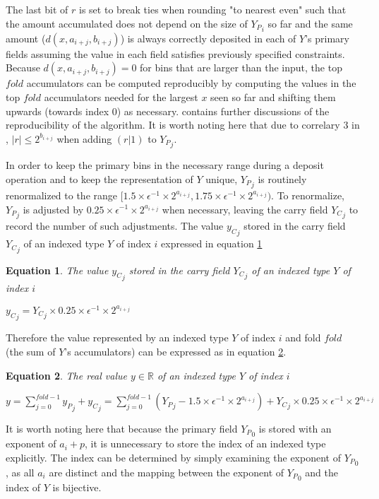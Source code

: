 \documentclass[12pt]{article}
\providecommand{\R}{\ensuremath{\mathbb{R}}}
\theoremstyle{plain}
\newtheorem{eq}{Equation}[section]
\begin{document}
      The last bit of $r$ is set to break ties when rounding "to nearest even" such that the amount accumulated does not depend on the size of ${Y_P}_i$ so far and the same amount ($d(x, a_{i + j}, b_{i + j})$) is always correctly deposited in each of $Y$'s primary fields assuming the value in each field satisfies previously specified constraints. Because $d(x, a_{i + j}, b_{i + j}) = 0$ for bins that are larger than the input, the top $fold$ accumulators can be computed reproducibly by computing the values in the top $fold$ accumulators needed for the largest $x$ seen so far and shifting them upwards (towards index $0$) as necessary. \cite{repsum} contains further discussions of the reproducibility of the algorithm.
      It is worth noting here that due to correlary $3$ in \cite{repsum}, $|r| \leq 2^{b_{i + j}}$ when adding $(r | 1)$ to ${Y_P}_j$.

      In order to keep the primary bins in the necessary range during a deposit operation and to keep the representation of $Y$ unique, ${Y_P}_j$ is routinely renormalized to the range $[1.5 \times\epsilon^{-1} \times 2^{a_{i + j}}, 1.75 \times\epsilon^{-1} \times 2^{a_{i + j}})$.
      To renormalize, ${Y_P}_j$ is adjusted by $0.25 \times\epsilon^{-1} \times 2^{a_{i + j}}$ when necessary, leaving the carry field ${Y_C}_j$ to record the number of such adjustments.
      The value ${y_C}_j$ stored in the carry field ${Y_C}_j$ of an indexed type $Y$ of index $i$ expressed in equation \ref{eq:car}
      \begin{eq} The value ${y_C}_j$ stored in the carry field ${Y_C}_j$ of an indexed type $Y$ of index $i$

        ${y_C}_j = {Y_C}_j \times 0.25\times\epsilon^{-1}\times2^{a_{i + j}}$
        \label{eq:car}
      \end{eq}
 Therefore the value represented by an indexed type $Y$ of index $i$ and fold $fold$ (the sum of $Y$'s accumulators) can be expressed as in equation \ref{eq:indexedvalue}.
      \begin{eq} The real value $y \in \R$ of an indexed type $Y$ of index $i$

        $y = \sum\limits_{j = 0}^{fold - 1} {y_P}_j + {y_C}_j = \sum\limits_{j = 0}^{fold - 1} ({Y_P}_j - 1.5 \times\epsilon^{-1}\times 2^{a_{i + j}}) + {Y_C}_j \times 0.25\times\epsilon^{-1}\times2^{a_{i + j}}$
        \label{eq:indexedvalue}
      \end{eq}
      It is worth noting here that because the primary field ${Y_P}_0$ is stored with an exponent of $a_i + p$, it is unnecessary to store the index of an indexed type explicitly. The index can be determined by simply examining the exponent of ${Y_P}_0$, as all $a_i$ are distinct and the mapping between the exponent of ${Y_P}_0$ and the index of $Y$ is bijective.
\end{document}
